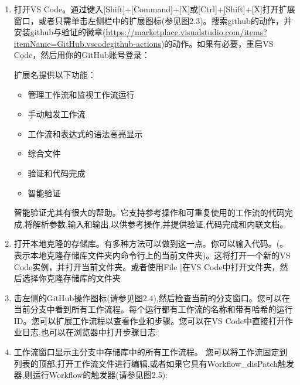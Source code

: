 \begin{enumerate}
\item 
打开VS Code。通过键入[Shift]+[Command]+[X]或[Ctrl]+[Shift]+[X]打开扩展窗口，或者只需单击左侧栏中的扩展图标(参见图2.3)。搜索github的动作，并安装github与验证的徽章(\url{https://marketplace.visualstudio.com/items?itemName=GitHub.vscodegithub-actions})的动作。如果有必要，重启VS Code，然后用你的GitHub账号登录：


扩展名提供以下功能：

\begin{itemize}
\item 
管理工作流和监视工作流运行

\item 
手动触发工作流

\item 
工作流和表达式的语法高亮显示

\item 
综合文件

\item 
验证和代码完成

\item 
智能验证
\end{itemize}

智能验证尤其有很大的帮助。它支持参考操作和可重复使用的工作流的代码完成,将解析参数,输入和输出,以供参考操作,并提供验证,代码完成和内联文档。

\item 
打开本地克隆的存储库。有多种方法可以做到这一点。你可以输入代码。(。表示本地克隆存储库文件夹内命令行上的当前文件夹)。这将打开一个新的VS Code实例，并打开当前文件夹。或者使用File |在VS Code中打开文件夹，然后选择你克隆存储库的文件夹

\item 
击左侧的GitHub操作图标(请参见图2.4),然后检查当前的分支窗口。您可以在当前分支中看到所有工作流程。每个运行都有工作流的名称和带有哈希的运行ID。您可以扩展工作流程以查看作业和步骤。您可以在VS Code中直接打开作业日志,也可以在浏览器中打开步骤日志:


\item 
工作流窗口显示主分支中存储库中的所有工作流程。 您可以将工作流固定到列表的顶部,打开工作流文件进行编辑,或者如果它具有Workflow\_disPatch触发器,则运行Workflow的触发器(请参见图2.5):


\end{enumerate}
